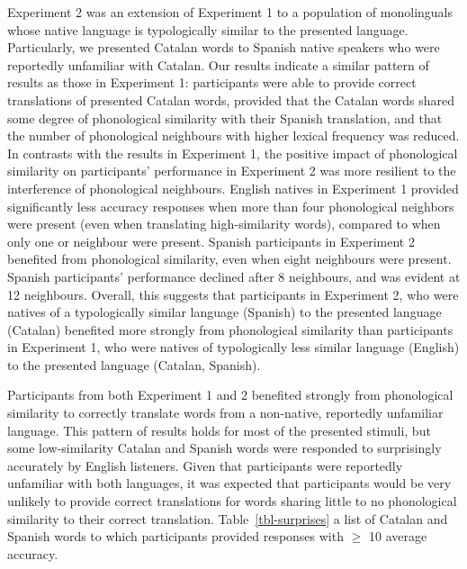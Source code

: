 \documentclass[
]{article}
\begin{document}
Experiment 2 was an extension of Experiment 1 to a population of
monolinguals whose native language is typologically similar to the
presented language. Particularly, we presented Catalan words to Spanish
native speakers who were reportedly unfamiliar with Catalan. Our results
indicate a similar pattern of results as those in Experiment 1:
participants were able to provide correct translations of presented
Catalan words, provided that the Catalan words shared some degree of
phonological similarity with their Spanish translation, and that the
number of phonological neighbours with higher lexical frequency was
reduced. In contrasts with the results in Experiment 1, the positive
impact of phonological similarity on participants' performance in
Experiment 2 was more resilient to the interference of phonological
neighbours. English natives in Experiment 1 provided significantly less
accuracy responses when more than four phonological neighbors were
present (even when translating high-similarity words), compared to when
only one or neighbour were present. Spanish participants in Experiment 2
benefited from phonological similarity, even when eight neighbours were
present. Spanish participants' performance declined after 8 neighbours,
and was evident at 12 neighbours. Overall, this suggests that
participants in Experiment 2, who were natives of a typologically
similar language (Spanish) to the presented language (Catalan) benefited
more strongly from phonological similarity than participants in
Experiment 1, who were natives of typologically less similar language
(English) to the presented language (Catalan, Spanish).

Participants from both Experiment 1 and 2 benefited strongly from
phonological similarity to correctly translate words from a non-native,
reportedly unfamiliar language. This pattern of results holds for most
of the presented stimuli, but some low-similarity Catalan and Spanish
words were responded to surprisingly accurately by English listeners.
Given that participants were reportedly unfamiliar with both languages,
it was expected that participants would be very unlikely to provide
correct translations for words sharing little to no phonological
similarity to their correct translation. Table~\ref{tbl-surprises} a
list of Catalan and Spanish words to which participants provided
responses with \(\geq\) 10 average accuracy.
\end{document}
